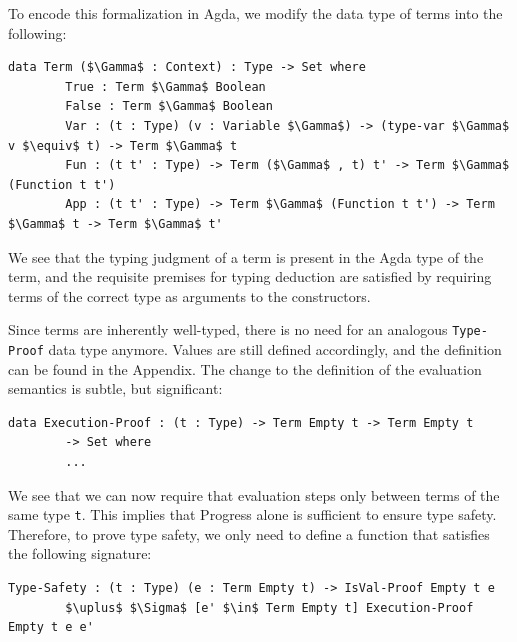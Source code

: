\documentclass[12pt, letterpaper]{article}
\begin{document}
To encode this formalization in Agda, we modify the data type of terms into the following:
\begin{Verbatim}[mathescape,commandchars=\\\{\}]
	data Term ($\Gamma$ : Context) : Type -> Set where
	    True : Term $\Gamma$ Boolean
    	False : Term $\Gamma$ Boolean
		Var : (t : Type) (v : Variable $\Gamma$) -> (type-var $\Gamma$ v $\equiv$ t) -> Term $\Gamma$ t
		Fun : (t t' : Type) -> Term ($\Gamma$ , t) t' -> Term $\Gamma$ (Function t t')
		App : (t t' : Type) -> Term $\Gamma$ (Function t t') -> Term $\Gamma$ t -> Term $\Gamma$ t'
\end{Verbatim}
We see that the typing judgment of a term is present in the Agda type of the term, and the requisite premises for typing deduction are satisfied by requiring terms of the correct type as arguments to the constructors. 

Since terms are inherently well-typed, there is no need for an analogous \texttt{Type-Proof} data type anymore. Values are still defined accordingly, and the definition can be found in the Appendix. The change to the definition of the evaluation semantics is subtle, but significant:
\begin{Verbatim}[mathescape,commandchars=\\\{\}]
	data Execution-Proof : (t : Type) -> Term Empty t -> Term Empty t 
		-> Set where
		...
\end{Verbatim}
We see that we can now require that evaluation steps only between terms of the same type \texttt{t}. This implies that Progress alone is sufficient to ensure type safety. Therefore, to prove type safety, we only need to define a function that satisfies the following signature:
\begin{Verbatim}[mathescape,commandchars=\\\{\}]
	Type-Safety : (t : Type) (e : Term Empty t) -> IsVal-Proof Empty t e 
		$\uplus$ $\Sigma$ [e' $\in$ Term Empty t] Execution-Proof Empty t e e'
\end{Verbatim}
\end{document}
